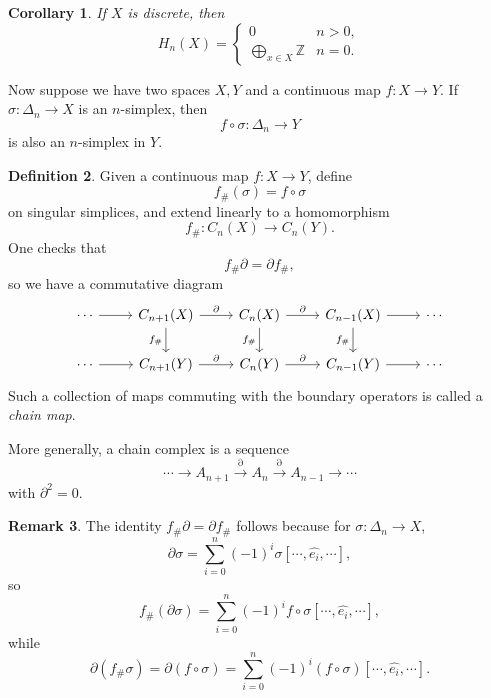 \documentclass[11pt,a4paper]{article}
\theoremstyle{definition}
\newtheorem{definition}{Definition}[section]
\newtheorem{remark}[definition]{Remark}
\theoremstyle{plain}
\newtheorem{corollary}[definition]{Corollary}
\theoremstyle{remark}
\newcommand{\1}{\mathbbm{1}}
\begin{document}
\begin{corollary}
    If $X$ is discrete, then
    \[
    H_n(X)=
    \begin{cases}
        0 & n>0,\\
        \displaystyle\bigoplus_{x\in X}\mathbb{Z} & n=0.
    \end{cases}
    \]
\end{corollary}

Now suppose we have two spaces $X,Y$ and a continuous map $f\colon X\to Y$. If $\sigma\colon \Delta_n\to X$ is an $n$-simplex,
then
\[
f\circ \sigma \colon \Delta_n\to Y
\]
is also an $n$-simplex in $Y$.

\begin{definition}
    Given a continuous map $f\colon X\to Y$, define
    \[
    f_\#(\sigma)=f\circ \sigma
    \]
    on singular simplices, and extend linearly to a homomorphism
    \[
    f_\# \colon C_n(X)\to C_n(Y).
    \]
    One checks that
    \[
    f_\#\partial=\partial f_\#,
    \]
    so we have a commutative diagram
    \[
    \begin{tikzcd}
    \cdots \arrow[r]
    & C_{n+1}(X) \arrow[r,"\partial"] \arrow[d,"f_\#"']
    & C_n(X) \arrow[r,"\partial"] \arrow[d,"f_\#"']
    & C_{n-1}(X) \arrow[r] \arrow[d,"f_\#"']
    & \cdots \\
    \cdots \arrow[r]
    & C_{n+1}(Y) \arrow[r,"\partial"]
    & C_n(Y) \arrow[r,"\partial"]
    & C_{n-1}(Y) \arrow[r]
    & \cdots
    \end{tikzcd}
    \]
    Such a collection of maps commuting with the boundary operators is called a \emph{chain map}.

    More generally, a chain complex is a sequence
    \[
    \cdots \to A_{n+1} \xrightarrow{\partial} A_n \xrightarrow{\partial} A_{n-1} \to \cdots
    \]
    with $\partial^2=0$.
\end{definition}

\begin{remark}
    The identity $f_\#\partial=\partial f_\#$ follows because for $\sigma\colon \Delta_n\to X$,
    \[
    \partial \sigma=\sum_{i=0}^n (-1)^i \sigma[\cdots,\hat{e_i},\cdots],
    \]
    so
    \[
    f_\#(\partial \sigma)
    =
    \sum_{i=0}^n (-1)^i f\circ \sigma[\cdots,\hat{e_i},\cdots],
    \]
    while
    \[
    \partial(f_\#\sigma)=\partial(f\circ \sigma)
    =
    \sum_{i=0}^n (-1)^i (f\circ \sigma)[\cdots,\hat{e_i},\cdots].
    \]
\end{remark}
\end{document}
